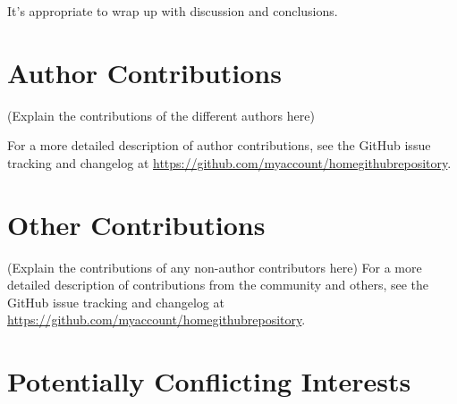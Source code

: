 \documentclass[9pt,review]{livecoms}
\newcommand{\githubrepository}{\url{https://github.com/myaccount/homegithubrepository}}  %
\begin{document}
It's appropriate to wrap up with discussion and conclusions.







\section*{Author Contributions}
%

(Explain the contributions of the different authors here)

For a more detailed description of author contributions,
see the GitHub issue tracking and changelog at \githubrepository.

\section*{Other Contributions}
%

(Explain the contributions of any non-author contributors here)
For a more detailed description of contributions from the community and others, see the GitHub issue tracking and changelog at \githubrepository.

\section*{Potentially Conflicting Interests}
\end{document}
